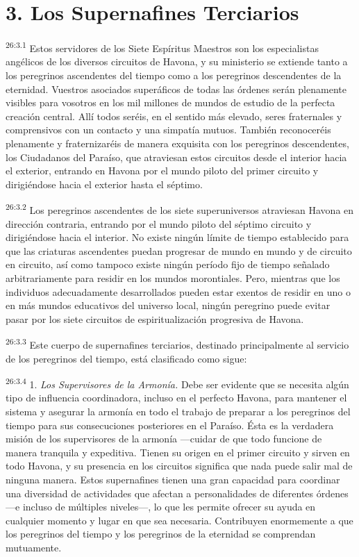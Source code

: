 \section*{3. Los Supernafines Terciarios}
\par
\textsuperscript{26:3.1} Estos servidores de los Siete Espíritus Maestros son los especialistas angélicos de los diversos circuitos de Havona, y su ministerio se extiende tanto a los peregrinos ascendentes del tiempo como a los peregrinos descendentes de la eternidad. Vuestros asociados superáficos de todas las órdenes serán plenamente visibles para vosotros en los mil millones de mundos de estudio de la perfecta creación central. Allí todos seréis, en el sentido más elevado, seres fraternales y comprensivos con un contacto y una simpatía mutuos. También reconoceréis plenamente y fraternizaréis de manera exquisita con los peregrinos descendentes, los Ciudadanos del Paraíso, que atraviesan estos circuitos desde el interior hacia el exterior, entrando en Havona por el mundo piloto del primer circuito y dirigiéndose hacia el exterior hasta el séptimo.

\par
\textsuperscript{26:3.2} Los peregrinos ascendentes de los siete superuniversos atraviesan Havona en dirección contraria, entrando por el mundo piloto del séptimo circuito y dirigiéndose hacia el interior. No existe ningún límite de tiempo establecido para que las criaturas ascendentes puedan progresar de mundo en mundo y de circuito en circuito, así como tampoco existe ningún período fijo de tiempo señalado arbitrariamente para residir en los mundos morontiales. Pero, mientras que los individuos adecuadamente desarrollados pueden estar exentos de residir en uno o en más mundos educativos del universo local, ningún peregrino puede evitar pasar por los siete circuitos de espiritualización progresiva de Havona.

\par
\textsuperscript{26:3.3} Este cuerpo de supernafines terciarios, destinado principalmente al servicio de los peregrinos del tiempo, está clasificado como sigue:

\par
\textsuperscript{26:3.4} 1. \textit{Los Supervisores de la Armonía.} Debe ser evidente que se necesita algún tipo de influencia coordinadora, incluso en el perfecto Havona, para mantener el sistema y asegurar la armonía en todo el trabajo de preparar a los peregrinos del tiempo para sus consecuciones posteriores en el Paraíso. Ésta es la verdadera misión de los supervisores de la armonía ---cuidar de que todo funcione de manera tranquila y expeditiva. Tienen su origen en el primer circuito y sirven en todo Havona, y su presencia en los circuitos significa que nada puede salir mal de ninguna manera. Estos supernafines tienen una gran capacidad para coordinar una diversidad de actividades que afectan a personalidades de diferentes órdenes ---e incluso de múltiples niveles---, lo que les permite ofrecer su ayuda en cualquier momento y lugar en que sea necesaria. Contribuyen enormemente a que los peregrinos del tiempo y los peregrinos de la eternidad se comprendan mutuamente.

